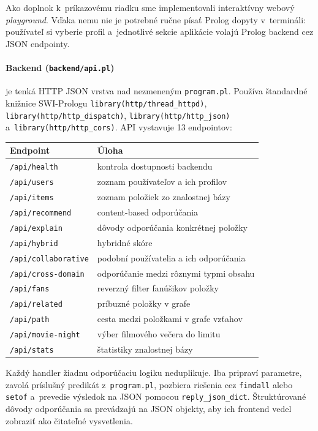 \documentclass[11pt,a4paper]{article}
\begin{document}
Ako doplnok k~príkazovému riadku sme implementovali interaktívny
webový \emph{playground}. Vďaka nemu nie je potrebné ručne písať
Prolog dopyty v~termináli: používateľ si vyberie profil a~jednotlivé
sekcie aplikácie volajú Prolog backend cez JSON endpointy.

\paragraph{Backend (\texttt{backend/api.pl})} je tenká HTTP JSON
vrstva nad nezmeneným \texttt{program.pl}. Používa štandardné
knižnice SWI-Prologu \texttt{library(http/thread\_httpd)},
\texttt{library(http/http\_dispatch)}, \texttt{library(http/http\_json)}
a~\texttt{library(http/http\_cors)}. API vystavuje 13 endpointov:

\begin{center}
\begin{tabular}{ll}
\toprule
\textbf{Endpoint} & \textbf{Úloha}\\
\midrule
\texttt{/api/health} & kontrola dostupnosti backendu\\
\texttt{/api/users} & zoznam používateľov a ich profilov\\
\texttt{/api/items} & zoznam položiek zo znalostnej bázy\\
\texttt{/api/recommend} & content-based odporúčania\\
\texttt{/api/explain} & dôvody odporúčania konkrétnej položky\\
\texttt{/api/hybrid} & hybridné skóre\\
\texttt{/api/collaborative} & podobní používatelia a ich odporúčania\\
\texttt{/api/cross-domain} & odporúčanie medzi rôznymi typmi obsahu\\
\texttt{/api/fans} & reverzný filter fanúšikov položky\\
\texttt{/api/related} & príbuzné položky v grafe\\
\texttt{/api/path} & cesta medzi položkami v grafe vzťahov\\
\texttt{/api/movie-night} & výber filmového večera do limitu\\
\texttt{/api/stats} & štatistiky znalostnej bázy\\
\bottomrule
\end{tabular}
\end{center}

Každý handler žiadnu odporúčaciu logiku neduplikuje. Iba pripraví
parametre, zavolá príslušný predikát z~\texttt{program.pl}, pozbiera
riešenia cez \texttt{findall} alebo \texttt{setof} a~prevedie výsledok
na JSON pomocou \texttt{reply\_json\_dict}. Štruktúrované dôvody
odporúčania sa prevádzajú na JSON objekty, aby ich frontend vedel
zobraziť ako čitateľné vysvetlenia.
\end{document}
